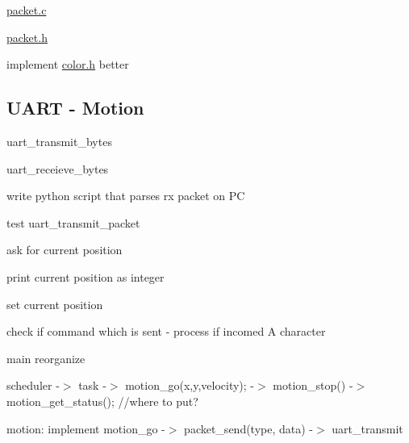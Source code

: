 
\begin{DoxyItemize}
\item \hyperlink{packet_8c}{packet.\+c}
\item \hyperlink{packet_8h}{packet.\+h}
\item implement \hyperlink{color_8h}{color.\+h} better
\end{DoxyItemize}

\subsection*{U\+A\+RT -\/ Motion }


\begin{DoxyItemize}
\item uart\+\_\+transmit\+\_\+bytes
\item uart\+\_\+receieve\+\_\+bytes
\item write python script that parses rx packet on PC
\item test uart\+\_\+transmit\+\_\+packet
\item ask for current position
\item print current position as integer
\item set current position
\item check if command which is sent -\/ process if incomed \textquotesingle{}A\textquotesingle{} character
\item main reorganize
\end{DoxyItemize}

scheduler -\/$>$ task -\/$>$ motion\+\_\+go(x,y,velocity); -\/$>$ motion\+\_\+stop() -\/$>$ motion\+\_\+get\+\_\+status(); //where to put?

motion\+: implement motion\+\_\+go -\/$>$ packet\+\_\+send(type, data) -\/$>$ uart\+\_\+transmit 